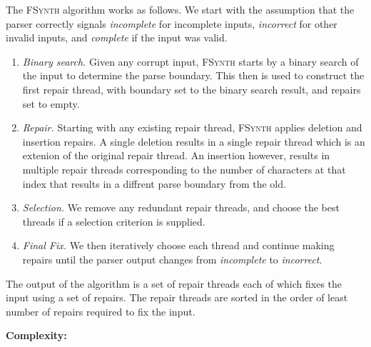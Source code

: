 \documentclass[sigconf,review,anonymous]{acmart}
\makeatletter
\newcounter{todocounter}
\newcommand{\todo}[1]{\marginpar{$|$}\textcolor{red}{\stepcounter{todocounter}\footnote[\thetodocounter]{\textcolor{red}{\textbf{TODO }}\textit{#1}}}}
\renewcommand{\todo}[1]{}
\newcommand{\approach}{\textsc{FSynth}\xspace}
\newcommand{\ddmax}{\textit{DDMax}\xspace}
\newcommand{\brepair}{\textsc{FSynth}\xspace}
\newcommand\letterboxed[1]{%
\setlength{\fboxsep}{0pt}%
  \@tfor\@ii:=#1\do{%
    \fcolorbox{white}{light-gray}{\texttt{\strut\@ii}}%
  }%
}
\makeatother
\begin{document}
The \brepair algorithm works as follows.
We start with the assumption that the parser correctly signals
\emph{incomplete} for incomplete inputs, \emph{incorrect} for other invalid
inputs, and \emph{complete} if the input was valid.\todo{we need to sync these steps with the workflow diagram (\autoref{fig:brepair_flowchart}), and also name/number steps 1,2, ...}

\begin{enumerate}
\item \emph{Binary search.} Given any corrupt input, \brepair starts by a
binary search of the input to determine the parse boundary. This then is used
to construct the first repair thread, with boundary set to the binary search
result, and repairs set to empty.

\item \emph{Repair.} Starting with any existing repair thread, \brepair applies
deletion and insertion repairs. A single deletion results in a single repair
thread which is an extenion of the original repair thread.
An insertion however, results in multiple repair threads corresponding to the
number of characters at that index that results in a diffrent parse boundary from
the old.

\item \emph{Selection.} We remove any redundant repair threads, and choose the best threads if a
selection criterion is supplied.

\item \emph{Final Fix.} We then iteratively choose each thread and continue making repairs
until the parser output changes from \emph{incomplete} to \emph{incorrect}.
\end{enumerate}

The output of the algorithm is a set of repair threads each of which fixes the
input using a set of repairs. The repair threads are sorted in the order of
least number of repairs required to fix the input.

\noindent
\textbf{Complexity:}\todo{what is the space/time complexity of the \approach, and how does this compare to that of \ddmax. }


%
\end{document}
